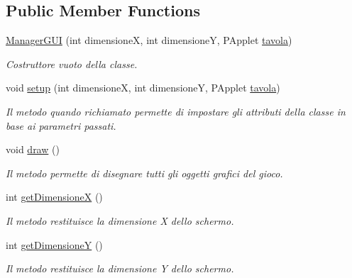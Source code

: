 \subsection*{Public Member Functions}
\begin{DoxyCompactItemize}
\item 
\mbox{\hyperlink{class_snake_1_1gui_1_1_manager_g_u_i_a2006dad197b32f07d7b3e790cac126ff}{Manager\+G\+UI}} (int dimensioneX, int dimensioneY, P\+Applet \mbox{\hyperlink{class_snake_1_1gui_1_1_manager_g_u_i_a75f316b1f7fa183ba86929af39a01720}{tavola}})
\begin{DoxyCompactList}\small\item\em Costruttore vuoto della classe. \end{DoxyCompactList}\item 
void \mbox{\hyperlink{class_snake_1_1gui_1_1_manager_g_u_i_a3d79a4983a721d8a1a7317431c3f2951}{setup}} (int dimensioneX, int dimensioneY, P\+Applet \mbox{\hyperlink{class_snake_1_1gui_1_1_manager_g_u_i_a75f316b1f7fa183ba86929af39a01720}{tavola}})
\begin{DoxyCompactList}\small\item\em Il metodo quando richiamato permette di impostare gli attributi della classe in base ai parametri passati. \end{DoxyCompactList}\item 
void \mbox{\hyperlink{class_snake_1_1gui_1_1_manager_g_u_i_a56c5cf8a568cff737ff95520cbe6b405}{draw}} ()
\begin{DoxyCompactList}\small\item\em Il metodo permette di disegnare tutti gli oggetti grafici del gioco. \end{DoxyCompactList}\item 
int \mbox{\hyperlink{class_snake_1_1gui_1_1_manager_g_u_i_a9e8362afc9e8ce68cca6528eb57869a2}{get\+DimensioneX}} ()
\begin{DoxyCompactList}\small\item\em Il metodo restituisce la dimensione X dello schermo. \end{DoxyCompactList}\item 
int \mbox{\hyperlink{class_snake_1_1gui_1_1_manager_g_u_i_a2bb8f24fa464bafa5b480a95b8b738a8}{get\+DimensioneY}} ()
\begin{DoxyCompactList}\small\item\em Il metodo restituisce la dimensione Y dello schermo. \end{DoxyCompactList}\end{DoxyCompactItemize}
